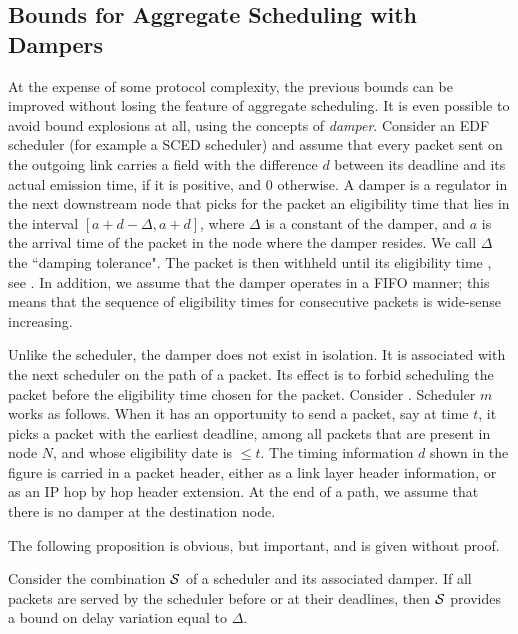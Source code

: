 \subsection{Bounds for Aggregate Scheduling with Dampers}

At the expense of some protocol complexity, the previous bounds
can be improved without losing the feature of aggregate
scheduling. It is even possible to avoid bound explosions at all,
using the concepts of \emph{damper}. Consider an EDF
scheduler (for example a SCED scheduler) and assume that every
packet sent on the outgoing link carries a field with the
difference $d$ between its deadline and its actual emission time,
if it is positive, and $0$ otherwise. A damper is a regulator in
the next downstream node that picks for the packet an eligibility
time that lies in the interval $[a+d-\Delta, a+d]$, where $\Delta$
is a constant of the damper, and $a$ is the arrival time of the
packet in the node where the damper resides.
We call $\Delta$ the ``damping tolerance".%
The packet is then withheld until its eligibility time
\cite{jitterEDD91,CruzSCED}, see . In addition,
we assume that the damper operates in a FIFO manner; this means
that the sequence of eligibility times for consecutive packets is
wide-sense increasing.

Unlike the scheduler, the damper does not exist in isolation. It
is associated with the next scheduler on the path of a packet. Its
effect is to forbid scheduling the packet before the eligibility
time chosen for the packet. Consider .
Scheduler $m$ works as follows. When it has an opportunity to send
a packet, say at time $t$, it picks a packet with the earliest
deadline, among all packets that are present in node $N$, and
whose eligibility date is $\leq t$. The timing information $d$
shown in the figure is carried in a packet header, either as a
link layer header information, or as an IP hop by hop header
extension. At the end of a path, we assume that there is no damper
at the destination node.

The following proposition is obvious, but important, and is given
without proof.
\begin{proposition}
Consider the combination $\mathcal S$ of a scheduler and its associated
damper. If all packets are served by the scheduler before or at
their deadlines, then $\mathcal S$ provides a bound on delay variation
equal to $\Delta$.
\end{proposition}
\begin{figure}[!htbp]
\end{figure}

